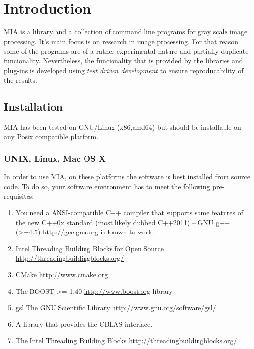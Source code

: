 \documentclass[english, 10pt, a4paper,headsepline,openany]{scrbook}
\begin{document}
\pagestyle{headings}


\chapter{Introduction}

MIA is a library and a collection of command line programs for gray scale image processing. 
It's main focus is on research in image processing.
For that reason some of the programs are of a rather experimental nature and partially 
   duplicate funcionality. 
Nevertheless, the funcionality that is provided by the libraries and plug-ins is developed 
  using \emph{test driven development} to ensure reproducability of the results.
 


\section{Installation}

MIA has been tested on GNU/Linux (x86,amd64) but should be installable on any Posix compatible platform. 


\subsection{UNIX, Linux, Mac OS X} 

In order to use MIA, on these platforms the software is best installed from source code. 
To do so, your software environment has to meet the following pre-requisites: 

\begin{enumerate}
\item You need a ANSI-compatible C++ compiler that supports some features of the new C++0x standard 
       (most likely dubbed C++2011) -- GNU g++ (>=4.5) \url{http://gcc.gnu.org} is known to work. 
\item Intel Threading Building Blocks for Open Source \url{http://threadingbuildingblocks.org/}
\item CMake \url{http://www.cmake.org}
\item The BOOST >= 1.40 \url{http://www.boost.org} library
\item gsl The GNU Scientific Library \url{http://www.gnu.org/software/gsl/}
\item A library that provides the CBLAS interface.
\item The Intel Threading Building Blocks \url{http://threadingbuildingblocks.org/}
\end{enumerate}
\end{document}
